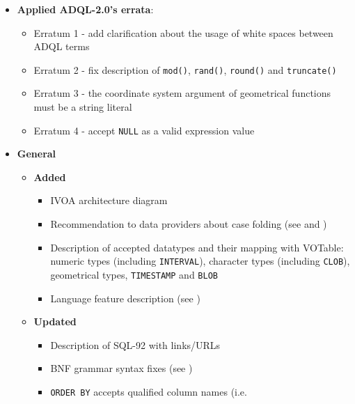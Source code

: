 \documentclass[11pt,a4paper]{ivoa}
\begin{document}
\begin{itemize}
    \item \textbf{Applied ADQL-2.0's errata}:
        \begin{itemize}
            \item Erratum 1 - add clarification about the usage of white spaces
                  between ADQL terms
            \item Erratum 2 - fix description of \verb:mod():, \verb:rand():,
                  \verb:round(): and \verb:truncate():
            \item Erratum 3 - the coordinate system argument of geometrical
                  functions must be a string literal
            \item Erratum 4 - accept \verb:NULL: as a valid expression value
        \end{itemize}
    \item \textbf{General}
        \begin{itemize}
            \item \textbf{Added}
                \begin{itemize}
                    \item IVOA architecture diagram 
                    \item Recommendation to data providers about case folding
                          (see  and
                          )
                    \item Description of accepted datatypes and their mapping
                          with VOTable: numeric types (including
                          \verb:INTERVAL:), character types (including
                          \verb:CLOB:), geometrical types, \verb:TIMESTAMP: and
                          \verb:BLOB: 
                    \item Language feature description
                          (see )
                \end{itemize}
            \item \textbf{Updated}
                \begin{itemize}
                    \item Description of SQL-92 with links/URLs
                    \item BNF grammar syntax fixes
                          (see )
                    \item \verb:ORDER BY: accepts qualified column names (i.e.

\end{itemize}
\end{itemize}
\end{itemize}
\end{document}
